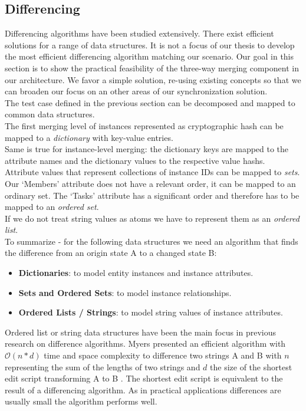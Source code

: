 \subsection{Differencing}
\label{sec:histo.merging.diff}
Differencing algorithms have been studied extensively.
There exist efficient solutions for a range of data structures.
It is not a focus of our thesis to develop the most efficient differencing algorithm matching our scenario.
Our goal in this section is to show the practical feasibility of the three-way merging component in our architecture.
We favor a simple solution, re-using existing concepts so that we can broaden our focus on an other areas of our synchronization solution.\\
The test case defined in the previous section can be decomposed and mapped to common data structures.\\
The first merging level of instances represented as cryptographic hash can be mapped to a \emph{dictionary} with key-value entries.\\
Same is true for instance-level merging: the dictionary keys are mapped to the attribute names and the dictionary values to the respective value hashs.\\
Attribute values that represent collections of instance IDs can be mapped to \emph{sets}.
Our `Members' attribute does not have a relevant order, it can be mapped to an ordinary set.
The `Tasks' attribute has a significant order and therefore has to be mapped to an \emph{ordered set}.\\
If we do not treat string values as atoms we have to represent them as an \emph{ordered list}.\\

To summarize - for the following data structures we need an algorithm that finds the difference from an origin state A to a changed state B:

\begin{itemize}
\item \textbf{Dictionaries}: to model entity instances and instance attributes.
\item \textbf{Sets and Ordered Sets}: to model instance relationships.
\item \textbf{Ordered Lists / Strings}: to model string values of instance attributes.
\end{itemize}

Ordered list or string data structures have been the main focus in previous research on difference algorithms.
Myers presented an efficient algorithm with $\mathcal O(n*d) $ time and space complexity to difference two strings A and B with
$ n $ representing the sum of the lengths of two strings and $ d $ the size of the shortest edit script transforming A to B \cite{Myers:1986wi}.
The shortest edit script is equivalent to the result of a differencing algorithm.
As in practical applications differences are usually small the algorithm performs well.\\

